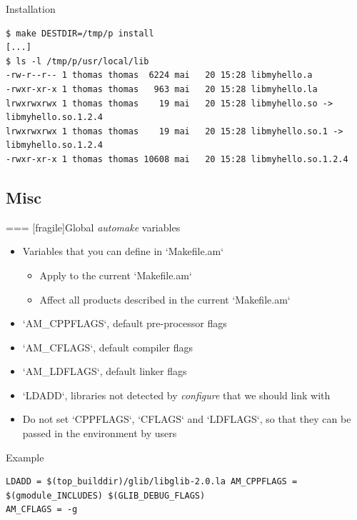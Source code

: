 \begin{block}{Installation}
\begin{verbatim}
$ make DESTDIR=/tmp/p install
[...]
$ ls -l /tmp/p/usr/local/lib
-rw-r--r-- 1 thomas thomas  6224 mai   20 15:28 libmyhello.a
-rwxr-xr-x 1 thomas thomas   963 mai   20 15:28 libmyhello.la lrwxrwxrwx 1 thomas thomas    19 mai   20 15:28 libmyhello.so -> libmyhello.so.1.2.4
lrwxrwxrwx 1 thomas thomas    19 mai   20 15:28 libmyhello.so.1 -> libmyhello.so.1.2.4
-rwxr-xr-x 1 thomas thomas 10608 mai   20 15:28 libmyhello.so.1.2.4
\end{verbatim}
\end{block}



\subsection{Misc}

=== [fragile]{Global {\em automake} variables}

  \begin{itemize}
  \item Variables that you can define in `Makefile.am`
    \begin{itemize}
    \item Apply to the current `Makefile.am`
    \item Affect all products described in the current `Makefile.am`
    \end{itemize}
  \item `AM_CPPFLAGS`, default pre-processor flags
  \item `AM_CFLAGS`, default compiler flags
  \item `AM_LDFLAGS`, default linker flags
  \item `LDADD`, libraries not detected by {\em configure} that we
    should link with
  \item Do not set `CPPFLAGS`, `CFLAGS` and `LDFLAGS`, so
    that they can be passed in the environment by users
  \end{itemize}

\begin{block}{Example}
\begin{verbatim}
LDADD = $(top_builddir)/glib/libglib-2.0.la AM_CPPFLAGS = $(gmodule_INCLUDES) $(GLIB_DEBUG_FLAGS)
AM_CFLAGS = -g
\end{verbatim}
\end{block}



